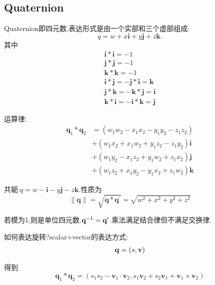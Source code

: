 	\subsection{Quaternion}
	Quaternion即四元数,表达形式是由一个实部和三个虚部组成:
	\begin{equation}
		q = w + x \bm i + y \bm j + z \bm k.
	\end{equation}
	其中
	\begin{equation}
		\begin{array}{c}
			\mathbf{i} * \mathbf{i}=-1 \\
			\mathbf{j} * \mathbf{j}=-1 \\
			\mathbf{k} * \mathbf{k}=-1 \\
			\mathbf{i} * \mathbf{j}=-\mathbf{j} * \mathbf{i}=\mathbf{k} \\
			\mathbf{j} * \mathbf{k}=-\mathbf{k} * \mathbf{j}=\mathbf{i} \\
			\mathbf{k} * \mathbf{i}=-\mathbf{i} * \mathbf{k}=\mathbf{j}
		\end{array}
	\end{equation}

	运算律:
	\begin{equation}
		\begin{aligned}
			\mathbf{q}_{1} * \mathbf{q}_{2} &=\left(w_{1} w_{2}-x_{1} x_{2}-y_{1} y_{2}-z_{1} z_{2}\right) \\
			&+\left(w_{1} x_{2}+x_{1} w_{2}+y_{1} z_{2}-z_{1} y_{2}\right) \mathbf{i} \\
			&+\left(w_{1} y_{2}-x_{1} z_{2}+y_{1} w_{2}+z_{1} x_{2}\right) \mathbf{j} \\
			&+\left(w_{1} z_{2}+x_{1} y_{2}-y_{1} x_{2}+z_{1} w_{2}\right) \mathbf{k}
		\end{aligned}
	\end{equation}

	共轭:$q = w - \bm i - y \bm j - z \bm k.$性质为
	\begin{equation}
		\|\mathbf{q}\|=\sqrt{\mathbf{q} * \mathbf{q}^{\prime}}=\sqrt{w^{2}+x^{2}+y^{2}+z^{2}}
	\end{equation}
	
	若模为1,则是单位四元数.$\bold{q}^{-1} = \bold{q}^\prime$.乘法满足结合律但不满足交换律.
	
	如何表达旋转?scalar+vector的表达方式:
	\begin{equation}
		\bold{q} = (s, \bold{v})
	\end{equation}
	
	得到
	\begin{equation}
		\mathbf{q}_{1} * \mathbf{q}_{2}=\left(s_{1} s_{2}-\mathbf{v}_{1} \cdot \mathbf{v}_{2}, s_{1} \mathbf{v}_{2}+s_{2} \mathbf{v}_{1}+\mathbf{v}_{1} \times \mathbf{v}_{2}\right)
	\end{equation}

